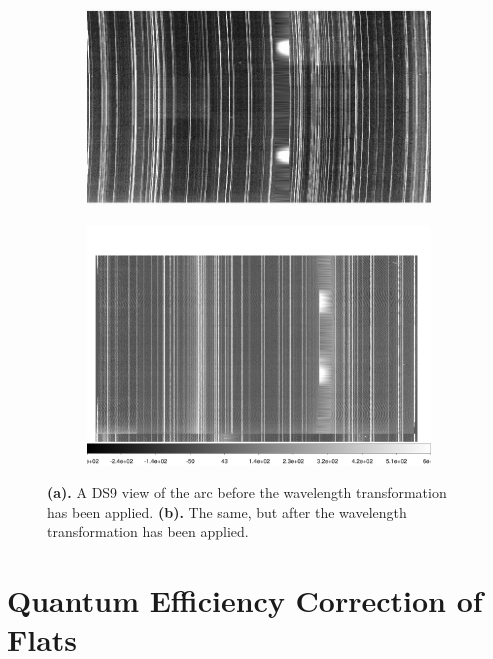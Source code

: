 \documentclass[12pt]{report}
\begin{document}
\begin{figure}[t]
\centering
\begin{subfigure}[t]{0.49\textwidth}
\includegraphics[width=\textwidth]{arc_before.jpeg}
\end{subfigure}
\hfill
\begin{subfigure}[t]{0.49\textwidth}
\includegraphics[width=\textwidth]{ds9}
\end{subfigure}
\caption[Before and After Wavelength Calibration]{\textbf{(a).} A DS9 view of the arc before the wavelength transformation has been applied. \textbf{(b).} The same, but after the wavelength transformation has been applied.}
\label{fig:wavecal}
\end{figure}

\section{Quantum Efficiency Correction of Flats}
\label{qecorr}
\end{document}
